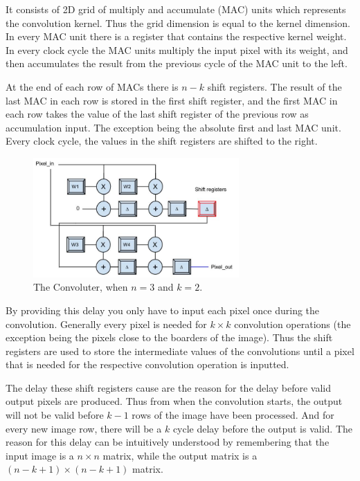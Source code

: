 It consists of 2D grid of multiply and accumulate (MAC) units which represents the convolution kernel. Thus the grid dimension is equal to the kernel dimension. In every MAC unit there is a register that contains the respective kernel weight. In every clock cycle the MAC units multiply the input pixel with its weight, and then accumulates the result from the previous cycle of the MAC unit to the left. 

At the end of each row of MACs there is $ n - k $ shift registers. The result of the last MAC in each row is stored in the first shift register, and the first MAC in each row takes the value of the last shift register of the previous row as accumulation input. The exception being the absolute first and last MAC unit. Every clock cycle, the values in the shift registers are shifted to the right. 

\begin{figure}[h!]
  \centering
      \includegraphics[width=0.7\textwidth]{Figures/Method/Convolver}
  \caption[The Convoluter ]{The Convoluter, when $ n = 3 $ and $ k = 2 $.}
\end{figure}
	
By providing this delay you only have to input each pixel once during the convolution. Generally every pixel is needed for $ k \times k $ convolution operations (the exception being the pixels close to the boarders of the image). Thus the shift registers are used to store the intermediate values of the convolutions until a pixel that is needed for the respective convolution operation is inputted. 

The delay these shift registers cause are the reason for the delay before valid output pixels are produced. Thus from when the convolution starts, the output will not be valid before $ k-1 $ rows of the image have been processed. And for every new image row, there will be a $ k $ cycle delay before the output is valid. The reason for this delay can be intuitively understood by remembering that the input image is a $ n \times n $ matrix, while the output matrix is a $ (n-k+1) \times (n-k+1) $ matrix. 

